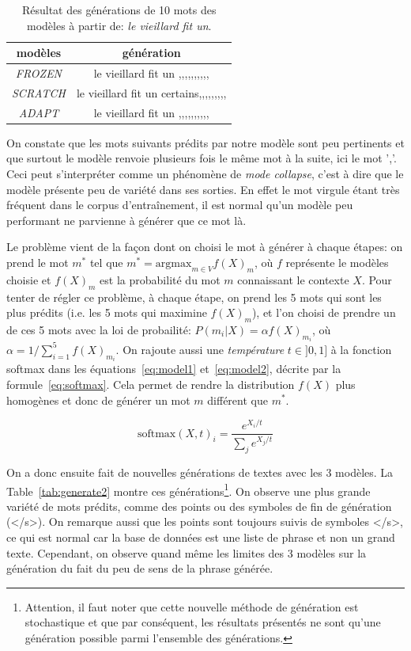 \documentclass[a4paper]{article}
\begin{document}
\begin{table}[ht]
  \centering
  \begin{tabular}{|c|c|}
      \hline
      modèles & génération \\
      \hline
      \textit{FROZEN} & le vieillard fit un ,,,,,,,,,, \\
      \textit{SCRATCH} & le vieillard fit un certains,,,,,,,,,\\
      \textit{ADAPT} & le vieillard fit un ,,,,,,,,,,\\
      \hline
  \end{tabular}
  \caption{Résultat des générations de 10 mots des modèles à partir de: \textit{le vieillard fit un}.}
  \label{tab:generate}
\end{table}

On constate que les mots suivants prédits par notre modèle sont peu pertinents et que surtout le modèle renvoie plusieurs fois le 
même mot à la suite, ici le mot ','. Ceci peut s'interpréter comme un phénomène de \textit{mode collapse}, c'est à dire 
que le modèle présente peu de variété dans ses sorties. En effet le mot virgule étant très fréquent dans le corpus 
d'entraînement, il est normal qu'un modèle peu performant ne parvienne à générer que ce mot là.

Le problème vient de la façon dont on choisi le mot à générer à chaque étapes: on prend le mot $m^*$ tel que
$m^* = \text{argmax}_{m \in V} f(X)_m$, où $f$ représente le modèles choisie et $f(X)_m$ est la probabilité du mot $m$ connaissant 
le contexte $X$. Pour tenter de régler ce problème, à chaque étape, on prend les 5
mots qui sont les plus prédits (i.e. les 5 mots qui maximine $f(X)_m$), et l'on choisi de prendre un de ces 5 mots avec la loi de probailité: 
$P(m_i|X) = \alpha f(X)_{m_i}$, où $\alpha = 1 / \sum_{i=1}^{5} f(X)_{m_i}$. On rajoute aussi une \textit{température} $t\in ]0, 1]$ 
à la fonction softmax dans 
les équations~\ref{eq:model1} et~\ref{eq:model2}, décrite par la formule~\ref{eq:softmax}. Cela permet de rendre
la distribution $f(X)$ plus homogènes et donc de générer un mot $m$ différent que $m^*$.

\begin{equation}
  \text{softmax}(X, t)_i = \frac{e^{X_i/t}}{\sum_{j}e^{X_j/t}}
  \label{eq:softmax}
\end{equation}

On a donc ensuite fait de nouvelles générations de textes avec les 3 modèles. La Table~\ref{tab:generate2}
montre ces générations\footnote{Attention, il faut noter que cette nouvelle méthode de génération est stochastique 
et que par conséquent, les résultats présentés ne sont qu'une génération possible parmi l'ensemble des générations.}. 
On observe une plus grande variété de mots prédits, comme des points ou des symboles de fin de génération (\textless/s\textgreater).
On remarque aussi que les points sont toujours suivis de symboles \textless/s\textgreater, ce qui est normal car la base de données est une liste de 
phrase et non un grand texte. Cependant, on observe quand même les limites des 3 modèles sur la génération du fait du peu de sens de la phrase générée.
\end{document}
